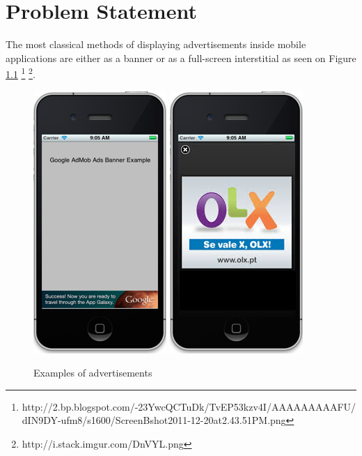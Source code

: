 
\chapter{Problem Statement} %


The most classical methods of displaying advertisements inside mobile applications are either as a banner or as a full-screen interstitial as seen on Figure \ref{fig:ads} \footnote{http://2.bp.blogspot.com/-23YwcQCTuDk/TvEP53kzv4I/AAAAAAAAAFU/dIN9DY-ufm8/s1600/ScreenBshot2011-12-20at2.43.51PM.png} \footnote{http://i.stack.imgur.com/DnVYL.png}.

\begin{figure}
\begin{center}
\includegraphics{Images/banner.png}
\includegraphics{Images/fullscreen.png}
\caption{Examples of advertisements}
\label{fig:ads}
\end{center}
\end{figure}

